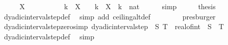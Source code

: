 \begin{isabellebody}
%
\isadelimproof
%
\endisadelimproof
%
\isatagproof
{}\isamarkupfalse%
\ {\isacharminus}{\kern0pt}\isanewline
\ \ \isamarkupfalse%
\ {\isachardoublequoteopen}X\ {\isasymin}\ {\isasymint}{\isachardoublequoteclose}\isanewline
\ \ \isamarkupfalse%
\ \isamarkupfalse%
\ {\isacharasterisk}{\kern0pt}{\isacharcolon}{\kern0pt}\ {\isachardoublequoteopen}{\isasymlfloor}{}\ {\isacharcircum}{\kern0pt}\ k\ {\isacharasterisk}{\kern0pt}\ X{\isasymrfloor}\ {\isacharequal}{\kern0pt}\ {}\ {\isacharcircum}{\kern0pt}\ k\ {\isacharasterisk}{\kern0pt}\ X{\isachardoublequoteclose}\ \ k\ {\isacharcolon}{\kern0pt}{\isacharcolon}{\kern0pt}\ nat\isanewline
\ \ \ \ \isamarkupfalse%
\ simp\isanewline
\ \ \isamarkupfalse%
\ \isamarkupfalse%
\ {\isacharquery}{\kern0pt}thesis\isanewline
\ \ \ \ \isamarkupfalse%
\ dyadic{\isacharunderscore}{\kern0pt}interval{\isacharunderscore}{\kern0pt}step{\isacharunderscore}{\kern0pt}def\ \isamarkupfalse%
\ {\isacharparenleft}{\kern0pt}simp\ add{\isacharcolon}{\kern0pt}\ ceiling{\isacharunderscore}{\kern0pt}altdef{\isacharparenright}{\kern0pt}\isanewline
\ \ \ \ \isamarkupfalse%
\ {\isacharasterisk}{\kern0pt}\ \isamarkupfalse%
\ presburger\isanewline
{}\isamarkupfalse%
%
\endisatagproof
{\isafoldproof}%
%
\isadelimproof
\isanewline
%
\endisadelimproof
\isanewline
{}\isamarkupfalse%
\ dyadic{\isacharunderscore}{\kern0pt}interval{\isacharunderscore}{\kern0pt}step{\isacharunderscore}{\kern0pt}zero{\isacharbrackleft}{\kern0pt}simp{\isacharbrackright}{\kern0pt}{\isacharcolon}{\kern0pt}\ {\isachardoublequoteopen}dyadic{\isacharunderscore}{\kern0pt}interval{\isacharunderscore}{\kern0pt}step\ {}\ S\ T\ {\isacharequal}{\kern0pt}\ real{\isacharunderscore}{\kern0pt}of{\isacharunderscore}{\kern0pt}int\ {\isacharbackquote}{\kern0pt}\ {\isacharbraceleft}{\kern0pt}{\isasymlceil}S{\isasymrceil}\ {\isachardot}{\kern0pt}{\isachardot}{\kern0pt}\ {\isasymlfloor}T{\isasymrfloor}{\isacharbraceright}{\kern0pt}{\isachardoublequoteclose}\isanewline
%
\isadelimproof
\ \ %
\endisadelimproof
%
\isatagproof
{}\isamarkupfalse%
\ dyadic{\isacharunderscore}{\kern0pt}interval{\isacharunderscore}{\kern0pt}step{\isacharunderscore}{\kern0pt}def\ \isamarkupfalse%
\ simp%
\endisatagproof
{\isafoldproof}%
%
\isadelimproof
\isanewline
%
\endisadelimproof
\isanewline
{}\isamarkupfalse%

\end{isabellebody}
